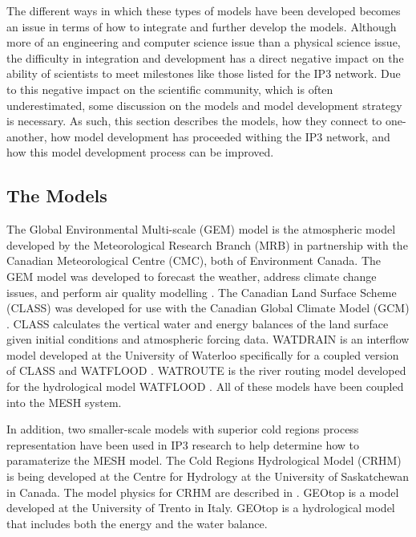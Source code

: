 \documentclass[hess]{copernicus}
\begin{document}
The different ways in which these types of models have been developed becomes an issue in terms of how to integrate and further develop the models. Although more of an engineering and computer science issue than a physical science issue, the difficulty in integration and development has a direct negative impact on the ability of scientists to meet milestones like those listed for the IP3 network. Due to this negative impact on the scientific community, which is often underestimated, some discussion on the models and model development strategy is necessary. As such, this section describes the models, how they connect to one-another, how model development has proceeded withing the IP3 network, and how this model development process can be improved.

\subsection{The Models}
The Global Environmental Multi-scale (GEM) model is the atmospheric model developed by the Meteorological Research Branch (MRB) in partnership with the Canadian Meteorological Centre (CMC), both of Environment Canada. The GEM model was developed to forecast the weather, address climate change issues, and perform air quality modelling \citep{cote_etal:1998}. The Canadian Land Surface Scheme (CLASS) was developed for use with the Canadian Global Climate Model (GCM) \citep{verseghy:1991,verseghy_etal:1993,verseghy:2009}. CLASS calculates the vertical water and energy balances of the land surface given initial conditions and atmospheric forcing data. WATDRAIN is an interflow model developed at the University of Waterloo specifically for a coupled version of CLASS and WATFLOOD \citep{soulis_etal:2000}. WATROUTE is the river routing model developed for the hydrological model WATFLOOD \citep{kouwen_mousavi:2002}. All of these models have been coupled into the MESH system.

In addition, two smaller-scale models with superior cold regions process representation have been used in IP3 research to help determine how to paramaterize the MESH model. The Cold Regions Hydrological Model (CRHM) is being developed at the Centre for Hydrology at the University of Saskatchewan in Canada. The model physics for CRHM are described in \cite{pomeroy_etal:2007}. GEOtop \citep{rigon_etal:2006,endrizzi:2007} is a model developed at the University of Trento in Italy. GEOtop is a hydrological model that includes both the energy and the water balance.
\end{document}
